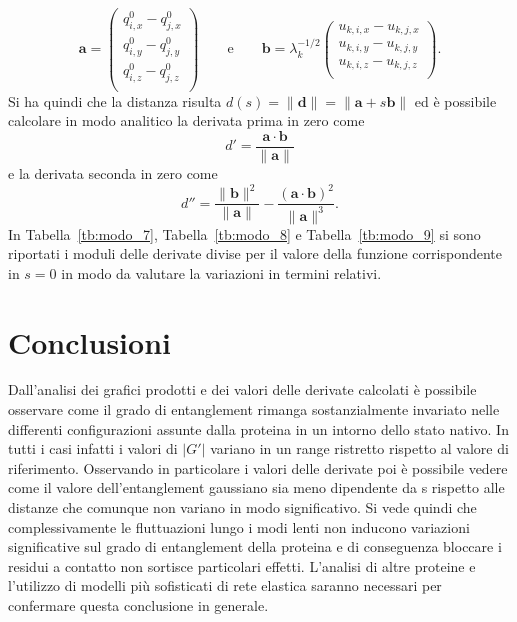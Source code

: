 \begin{equation}
\mathbf{a} =
\left(
\begin{array}{ccc}
q^{0}_{i,x} - q^{0}_{j,x}\\
q^{0}_{i,y} - q^{0}_{j,y}\\
q^{0}_{i,z} - q^{0}_{j,z}\\
\end{array}
\right)
\qquad \mathrm{e} \qquad
\mathbf{b} = 
\lambda_{k}^{-1/2}
\left(
\begin{array}{ccc}
u_{k,i,x} - u_{k,j,x}\\
u_{k,i,y} - u_{k,j,y}\\
u_{k,i,z} - u_{k,j,z}\\
\end{array}
\right).
\end{equation}
Si ha quindi che la distanza risulta  $ d(s) = \lVert \mathbf{d} \rVert = \lVert \mathbf{a} + s \mathbf{b} \rVert$ ed è possibile calcolare in modo analitico la derivata prima in zero come
\begin{equation}
d' =  \frac{\mathbf{a} \cdot \mathbf{b}}{ \lVert \mathbf{a} \rVert }
\end{equation}
e la derivata seconda in zero come
\begin{equation}
d'' =  \frac{\lVert \mathbf{b} \rVert^2}{ \lVert \mathbf{a} \rVert } - \frac{ \left( \mathbf{a} \cdot \mathbf{b} \right)^2}{ \lVert\mathbf{a} \rVert^3 }.
\end{equation}
In Tabella~\ref{tb:modo_7}, Tabella~\ref{tb:modo_8} e Tabella~\ref{tb:modo_9} si sono riportati i moduli delle derivate divise per il valore della funzione corrispondente in $ s=0 $ in modo da valutare la variazioni in termini relativi.

\section{Conclusioni}
Dall'analisi dei grafici prodotti e dei valori delle derivate calcolati è possibile osservare come il grado di entanglement rimanga sostanzialmente invariato nelle differenti configurazioni assunte dalla proteina in un intorno dello stato nativo. In tutti i casi infatti i valori di $ \lvert G' \rvert $ variano in un range ristretto rispetto al valore di riferimento. Osservando in particolare i valori delle derivate poi è possibile vedere come il valore dell'entanglement gaussiano sia meno dipendente da s rispetto alle distanze che comunque non variano in modo significativo. 
Si vede quindi che complessivamente le fluttuazioni lungo i modi lenti non inducono variazioni significative sul grado di entanglement della proteina e di conseguenza bloccare i residui a contatto non sortisce particolari effetti. 
L'analisi di altre proteine e l'utilizzo di modelli più sofisticati di rete elastica \cite{md} saranno necessari per confermare questa conclusione in generale.

